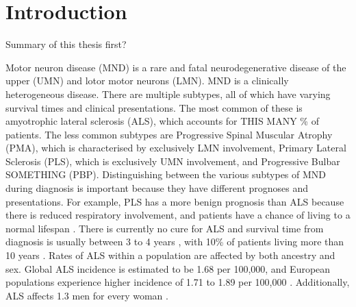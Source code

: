 \chapter{Introduction}
\label{introduction}

Summary of this thesis first?

Motor neuron disease (MND) is a rare and fatal neurodegenerative disease of the upper (UMN) and lotor motor neurons (LMN).
MND is a clinically heterogeneous disease. There are multiple subtypes, all of which have varying survival times and clinical presentations. The most common of these is amyotrophic lateral sclerosis (ALS), which accounts for THIS MANY \% of patients. The less common subtypes are Progressive Spinal Muscular Atrophy (PMA), which is characterised by exclusively LMN involvement, Primary Lateral Sclerosis (PLS), which is exclusively UMN involvement, and Progressive Bulbar SOMETHING (PBP). Distinguishing between the various subtypes of MND during diagnosis is important because they have different prognoses and presentations. For example, PLS has a more benign prognosis than ALS because there is reduced respiratory involvement, and patients have a chance of living to a normal lifespan \cite{statlandPrimaryLateralSclerosis2015}.
There is currently no cure for ALS and survival time from diagnosis is usually between 3 to 4 years \cite{swinnenPhenotypicVariabilityAmyotrophic2014, goutmanRecentAdvancesDiagnosis2022a}, with 10\% of patients living more than 10 years \cite{pupilloLongtermSurvivalAmyotrophic2014}.
Rates of ALS within a population are affected by both ancestry and sex. Global ALS incidence is estimated to be 1.68 per 100,000, and European populations experience higher incidence of 1.71 to 1.89 per 100,000 \cite{marinVariationWorldwideIncidence2017}. Additionally, ALS affects 1.3 men for every woman \cite{fontanaTimetrendEvolutionDeterminants2021}.

